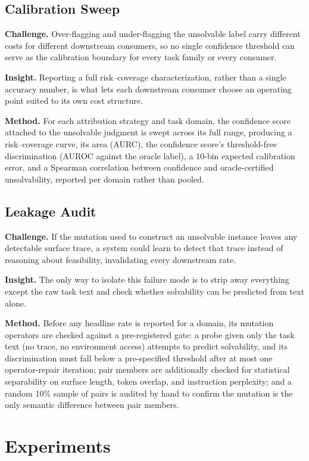 \documentclass[11pt]{article}
\begin{document}
\subsection{Calibration Sweep}
\textbf{Challenge.} Over-flagging and under-flagging the unsolvable label carry different costs for different downstream consumers, so no single confidence threshold can serve as the calibration boundary for every task family or every consumer.

\textbf{Insight.} Reporting a full risk--coverage characterization, rather than a single accuracy number, is what lets each downstream consumer choose an operating point suited to its own cost structure.

\textbf{Method.} For each attribution strategy and task domain, the confidence score attached to the unsolvable judgment is swept across its full range, producing a risk--coverage curve, its area (AURC), the confidence score's threshold-free discrimination (AUROC against the oracle label), a 10-bin expected calibration error, and a Spearman correlation between confidence and oracle-certified unsolvability, reported per domain rather than pooled.

\subsection{Leakage Audit}
\textbf{Challenge.} If the mutation used to construct an unsolvable instance leaves any detectable surface trace, a system could learn to detect that trace instead of reasoning about feasibility, invalidating every downstream rate.

\textbf{Insight.} The only way to isolate this failure mode is to strip away everything except the raw task text and check whether solvability can be predicted from text alone.

\textbf{Method.} Before any headline rate is reported for a domain, its mutation operators are checked against a pre-registered gate: a probe given only the task text (no trace, no environment access) attempts to predict solvability, and its discrimination must fall below a pre-specified threshold after at most one operator-repair iteration; pair members are additionally checked for statistical separability on surface length, token overlap, and instruction perplexity; and a random 10\% sample of pairs is audited by hand to confirm the mutation is the only semantic difference between pair members.

\section{Experiments}
\end{document}
